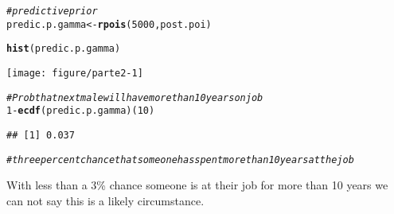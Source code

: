 \documentclass[12pt]{article}\usepackage[]{graphicx}\usepackage[]{color}
\makeatletter
\def\maxwidth{ %
  \ifdim\Gin@nat@width>\linewidth
    \linewidth
  \else
    \Gin@nat@width
  \fi
}
\newcommand{\hlnum}[1]{\textcolor[rgb]{0.686,0.059,0.569}{#1}}%
\newcommand{\hlcom}[1]{\textcolor[rgb]{0.678,0.584,0.686}{\textit{#1}}}%
\newcommand{\hlopt}[1]{\textcolor[rgb]{0,0,0}{#1}}%
\newcommand{\hlstd}[1]{\textcolor[rgb]{0.345,0.345,0.345}{#1}}%
\newcommand{\hlkwb}[1]{\textcolor[rgb]{0.69,0.353,0.396}{#1}}%
\newcommand{\hlkwd}[1]{\textcolor[rgb]{0.737,0.353,0.396}{\textbf{#1}}}%
\newenvironment{kframe}{%
 \def\at@end@of@kframe{}%
 \ifinner\ifhmode%
  \def\at@end@of@kframe{\end{minipage}}%
  \begin{minipage}{\columnwidth}%
 \fi\fi%
 \def\FrameCommand##1{\hskip\@totalleftmargin \hskip-\fboxsep
 \colorbox{shadecolor}{##1}\hskip-\fboxsep
     \hskip-\linewidth \hskip-\@totalleftmargin \hskip\columnwidth}%
 \MakeFramed {\advance\hsize-\width
   \@totalleftmargin\z@ \linewidth\hsize
   \@setminipage}}%
 {\par\unskip\endMakeFramed%
 \at@end@of@kframe}
\newenvironment{knitrout}{}{} %
\makeatother
\begin{document}
\begin{knitrout}
\color{fgcolor}\begin{kframe}
\begin{alltt}
\hlcom{#predictive prior}
\hlstd{predic.p.gamma} \hlkwb{<-} \hlkwd{rpois}\hlstd{(}\hlnum{5000}\hlstd{,post.poi)}


\hlkwd{hist}\hlstd{(predic.p.gamma)}
\end{alltt}
\end{kframe}

{\centering \texttt{[image: figure/parte2-1]} 

}


\begin{kframe}\begin{alltt}
\hlcom{# Prob that next male will have more than 10 years on job}
\hlnum{1}\hlopt{-}\hlkwd{ecdf}\hlstd{(predic.p.gamma)(}\hlnum{10}\hlstd{)}
\end{alltt}
\begin{verbatim}
## [1] 0.037
\end{verbatim}
\begin{alltt}
\hlcom{# three percent chance that someone has spent more than 10 years at the job}
\end{alltt}
\end{kframe}
\end{knitrout}
With less than a 3\% chance someone is at their job for more than 10 years we can not say this is a likely circumstance.

 
\end{document}
